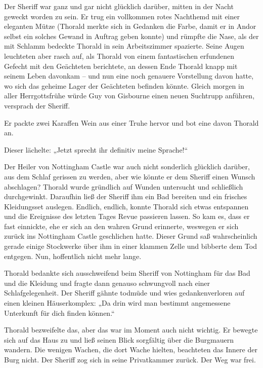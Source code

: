 \documentclass[10pt, a4paper, oneside]{book}
\begin{document}
Der Sheriff war ganz und gar nicht glücklich darüber, mitten in der Nacht geweckt worden zu sein. Er trug ein vollkommen rotes Nachthemd mit einer eleganten Mütze (Thorald merkte sich in Gedanken die Farbe, damit er in Andor selbst ein solches Gewand in Auftrag geben konnte) und rümpfte die Nase, als der mit Schlamm bedeckte Thorald in sein Arbeitszimmer spazierte. Seine Augen leuchteten aber rasch auf, als Thorald von einem fantastischen erfundenen Gefecht mit den Geächteten berichtete, an dessen Ende Thorald knapp mit seinem Leben davonkam – und nun eine noch genauere Vorstellung davon hatte, wo sich das geheime Lager der Geächteten befinden könnte. Gleich morgen in aller Herrgottsfrühe würde Guy von Gisbourne einen neuen Suchtrupp anführen, versprach der Sheriff.

Er packte zwei Karaffen Wein aus einer Truhe hervor und bot eine davon Thorald an.

Dieser lächelte: „Jetzt sprecht ihr definitiv meine Sprache!“\bigskip







Der Heiler von Nottingham Castle war auch nicht sonderlich glücklich darüber, aus dem Schlaf gerissen zu werden, aber wie könnte er dem Sheriff einen Wunsch abschlagen? Thorald wurde gründlich auf Wunden untersucht und schließlich durchgewinkt. Daraufhin ließ der Sheriff ihm ein Bad bereiten und ein frisches Kleidungsset auslegen. Endlich, endlich, konnte Thorald sich etwas entspannen und die Ereignisse des letzten Tages Revue passieren lassen. So kam es, dass er fast einnickte, ehe er sich an den wahren Grund erinnerte, weswegen er sich zurück ins Nottingham Castle geschlichen hatte. Dieser Grund saß wahrscheinlich gerade einige Stockwerke über ihm in einer klammen Zelle und bibberte dem Tod entgegen. Nun, hoffentlich nicht mehr lange.

Thorald bedankte sich ausschweifend beim Sheriff von Nottingham für das Bad und die Kleidung und fragte dann genauso schwungvoll nach einer Schlafgelegenheit. Der Sheriff gähnte todmüde und wies gedankenverloren auf einen kleinen Häuserkomplex: „Da drin wird man bestimmt angemessene Unterkunft für dich finden können.“

Thorald bezweifelte das, aber das war im Moment auch nicht wichtig. Er bewegte sich auf das Haus zu und ließ seinen Blick sorgfältig über die Burgmauern wandern. Die wenigen Wachen, die dort Wache hielten, beachteten das Innere der Burg nicht. Der Sheriff zog sich in seine Privatkammer zurück. Der Weg war frei.
\end{document}
